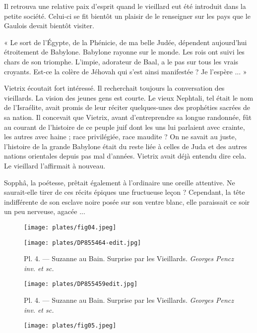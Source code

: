 \documentclass[a4paper, 11pt, oneside, polutonikogreek, french]{article}
\begin{document}
\bigskip
\centerline{\EightStarTaper}
\centerline{\EightStarTaper\EightStarTaper}
\bigskip

Il retrouva une relative paix d'esprit quand le vieillard eut été introduit dans la petite société. Celui-ci se fit bientôt un plaisir de le renseigner sur les pays que le Gaulois devait bientôt visiter.

« Le sort de l'Égypte, de la Phénicie, de ma belle Judée, dépendent aujourd'hui étroitement de Babylone. Babylone rayonne sur le monde. Les rois ont suivi les chars de son triomphe. L'impie, adorateur de Baal, a le pas sur tous les vrais croyants. Est-ce la colère de Jéhovah qui s'est ainsi manifestée ? Je l'espère ... »

Vietrix écoutait fort intéressé. Il recherchait toujours la conversation des vieillards. La vision des jeunes gens est courte. Le vieux Nephtali, tel était le nom de l'Israélite, avait promis de leur réciter quelques-unes des prophéties sacrées de sa nation. Il concevait que Vietrix, avant d'entreprendre sa longue randonnée, fût au courant de l'histoire de ce peuple juif dont les uns lui parlaient avec crainte, les autres avec haine ; race privilégiée, race maudite ? On ne savait au juste, l'histoire de la grande Babylone était du reste liée à celles de Juda et des autres nations orientales depuis pas mal d'années. Vietrix avait déjà entendu dire cela. Le vieillard l'affirmait à nouveau.

Sopphâ, la poétesse, prêtait également à l'ordinaire une oreille attentive. Ne saurait-elle tirer de ces récits épiques une fructueuse leçon ? Cependant, la tête indifférente de son esclave noire posée sur son ventre blanc, elle paraissait ce soir un peu nerveuse, agacée ...

\begin{figure}[H]
\centering
\texttt{[image: plates/fig04.jpeg]}
\end{figure}
\clearpage
\vspace*{\fill}
\begin{figure}[H]
\centering
\texttt{[image: plates/DP855464-edit.jpg]}
\caption{\Fontauri Pl. 4. --- Suzanne au Bain. Surprise par les Vieillards. \emph{Georges Pencz inv. et sc.}}
\end{figure}
\vspace*{\fill}
\begin{figure}[H]
\centering
\texttt{[image: plates/DP855459edit.jpg]}
\caption{\Fontauri Pl. 4. --- Suzanne au Bain. Surprise par les Vieillards. \emph{Georges Pencz inv. et sc.}}
\end{figure}
\vspace*{\fill}
\clearpage
\begin{figure}[H]
\centering
\texttt{[image: plates/fig05.jpeg]}
\end{figure}
\end{document}

